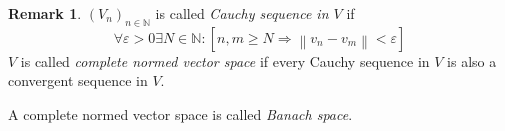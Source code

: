 \documentclass[a4paper,landscape,twocolumn]{article}
\theoremstyle{definition}
\newtheorem{rem}{Remark}
\newcommand\norm[1]{\left\|#1\right\|}
\begin{document}
\begin{rem}
  $(V_n)_{n\in\mathbb N}$ is called \emph{Cauchy sequence in $V$} if
  \[ \forall \varepsilon > 0 \exists N \in \mathbb N: [n,m \geq N \Rightarrow \norm{v_n - v_m} < \varepsilon] \]
  $V$ is called \emph{complete normed vector space} if every Cauchy sequence in $V$
  is also a convergent sequence in $V$.

  A complete normed vector space is called \emph{Banach space}.
\end{rem}
\end{document}
